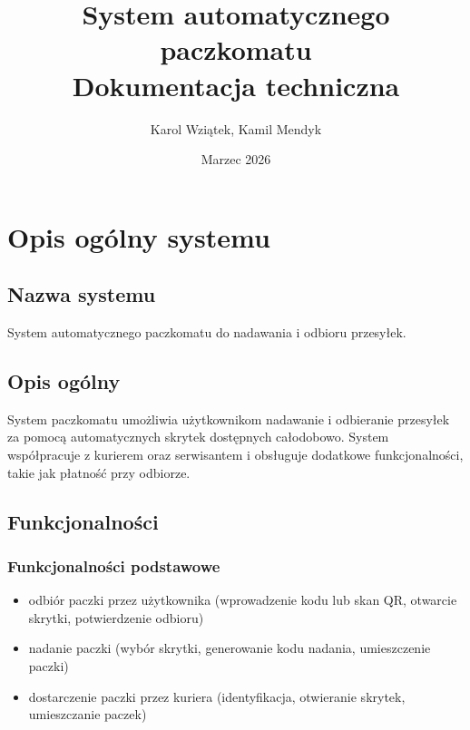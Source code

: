 \documentclass[a4paper,12pt]{article}
\title{%
  \textbf{System automatycznego paczkomatu}\\[0.5em]
  \large Dokumentacja techniczna%
}
\author{Karol Wziątek, Kamil Mendyk}
\date{Marzec 2026}
\begin{document}
\maketitle
\newpage

\tableofcontents
\newpage

\section{Opis ogólny systemu}

\subsection{Nazwa systemu}
System automatycznego paczkomatu do nadawania i odbioru przesyłek.

\subsection{Opis ogólny}
System paczkomatu umożliwia użytkownikom nadawanie i odbieranie przesyłek
za pomocą automatycznych skrytek dostępnych całodobowo. System współpracuje
z kurierem oraz serwisantem i obsługuje dodatkowe funkcjonalności, takie jak
płatność przy odbiorze.

\subsection{Funkcjonalności}

\subsubsection{Funkcjonalności podstawowe}
\begin{itemize}
  \item odbiór paczki przez użytkownika (wprowadzenie kodu lub skan QR, otwarcie skrytki, potwierdzenie odbioru)
  \item nadanie paczki (wybór skrytki, generowanie kodu nadania, umieszczenie paczki)
  \item dostarczenie paczki przez kuriera (identyfikacja, otwieranie skrytek, umieszczanie paczek)
\end{itemize}
\end{document}
